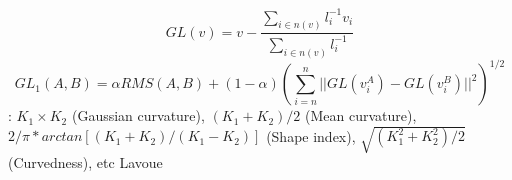 \begin{equation}
GL(v)= v-\frac{\sum_{i \in n(v)}{l_i^{-1}v_i}}{\sum_{i \in n(v)}{l_i^{-1}}}
\end{equation}
\begin{equation}
GL_1(A,B)= \alpha RMS(A,B) + (1- \alpha)(\sum_{i=n}^n{||GL(v_i^A)-GL(v_i^B)||^2})^{1/2}
\end{equation}
: $ K_1 \times K_2$ (Gaussian curvature), $ (K_1+ K_2)/2$ (Mean curvature), $2/\pi *arctan[(K_1+ K_2)/( K_1- K_2)]$ (Shape index), $\sqrt{ (K_1^2+ K_2^2)/2}$ (Curvedness), etc
Lavoue\’ 